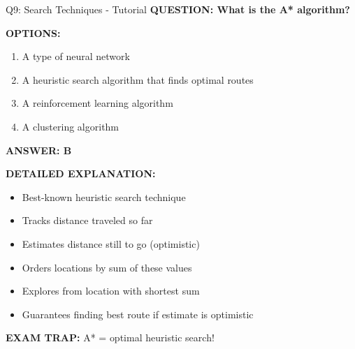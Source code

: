 \documentclass[8pt]{beamer}
\begin{document}
	\begin{frame}{Q9: Search Techniques - Tutorial}
		\fontsize{6.5}{7.5}\selectfont
		\textbf{QUESTION: What is the A* algorithm?}
		
		\vspace{0.1cm}
		\textbf{OPTIONS:}
		\begin{enumerate}
			\item A type of neural network
			\item A heuristic search algorithm that finds optimal routes
			\item A reinforcement learning algorithm
			\item A clustering algorithm
		\end{enumerate}
		
		\vspace{0.1cm}
		\textcolor{myblue}{\textbf{ANSWER: B}}
		
		\vspace{0.1cm}
		\textbf{DETAILED EXPLANATION:}
		\begin{itemize}
			\item Best-known heuristic search technique
			\item Tracks distance traveled so far
			\item Estimates distance still to go (optimistic)
			\item Orders locations by sum of these values
			\item Explores from location with shortest sum
			\item Guarantees finding best route if estimate is optimistic
		\end{itemize}
		
		\vspace{0.1cm}
		\textcolor{myred}{\textbf{EXAM TRAP:}} A* = \textcolor{myblue}{optimal heuristic search}!
	\end{frame}
	
\end{document}
